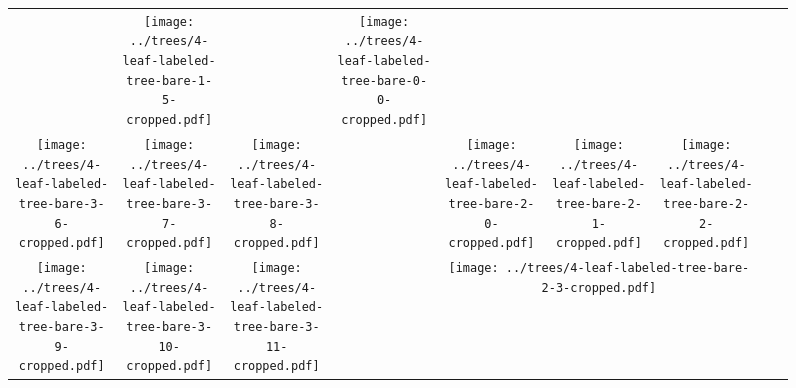 \documentclass[border=10pt,varwidth=30cm]{standalone}
\newcommand{\pltwidth}{0.1}
\begin{document}
\begin{figure}
\begin{tabular}{@{}|ccc|cccccc@{}}
        &
        \texttt{[image: ../trees/4-leaf-labeled-tree-bare-1-5-cropped.pdf]}
        &
        &
        \texttt{[image: ../trees/4-leaf-labeled-tree-bare-0-0-cropped.pdf]}
        \\
        \texttt{[image: ../trees/4-leaf-labeled-tree-bare-3-6-cropped.pdf]}
        &
        \texttt{[image: ../trees/4-leaf-labeled-tree-bare-3-7-cropped.pdf]}
        &
        \texttt{[image: ../trees/4-leaf-labeled-tree-bare-3-8-cropped.pdf]}
        &
        &
        \texttt{[image: ../trees/4-leaf-labeled-tree-bare-2-0-cropped.pdf]}
        &
        \texttt{[image: ../trees/4-leaf-labeled-tree-bare-2-1-cropped.pdf]}
        &
        \texttt{[image: ../trees/4-leaf-labeled-tree-bare-2-2-cropped.pdf]}
        &
        &
        \\
        \texttt{[image: ../trees/4-leaf-labeled-tree-bare-3-9-cropped.pdf]}
        &
        \texttt{[image: ../trees/4-leaf-labeled-tree-bare-3-10-cropped.pdf]}
        &
        \texttt{[image: ../trees/4-leaf-labeled-tree-bare-3-11-cropped.pdf]}
        &
        &
        \multicolumn{3}{c}{\texttt{[image: ../trees/4-leaf-labeled-tree-bare-2-3-cropped.pdf]}}
        &
        &
        \\
        \cline{1-3}
    \end{tabular}
\end{figure}
\end{document}
